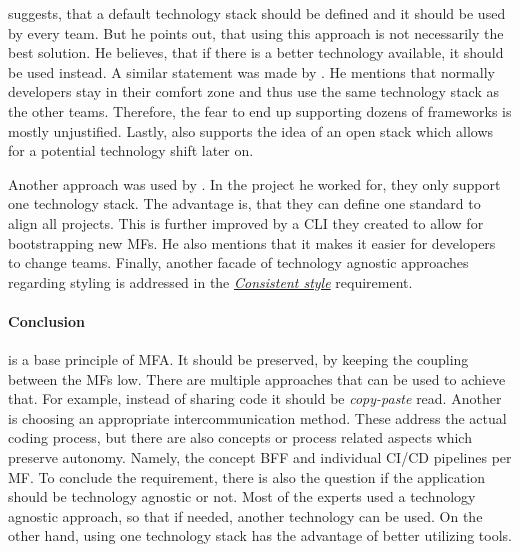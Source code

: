\textciteJovanovic{} suggests, that a default technology stack should be defined and it should be used by every team.
But he points out, that using this approach is not necessarily the best solution.
He believes, that if there is a better technology available, it should be used instead.
A similar statement was made by \textcite{Laug.2018b}.
He mentions that normally developers stay in their comfort zone and thus use the same technology stack as the other teams.
Therefore, the fear to end up supporting dozens of frameworks is mostly unjustified.
Lastly, \textciteHuber{} also supports the idea of an open stack which allows for a potential technology shift later on.

Another approach was used by \textcite{Grijzen.2019}.
In the project he worked for, they only support one technology stack.
The advantage is, that they can define one standard to align all projects.
This is further improved by a \ac{CLI} they created to allow for bootstrapping new \acp{MF}.
He also mentions that it makes it easier for developers to change teams.
Finally, another facade of technology agnostic approaches regarding styling is addressed  in the \textit{\hyperref[cha:requirement_detail_style]{Consistent style}} requirement.



\paragraph{Conclusion}

\textit{} is a base principle of \ac{MFA}.
It should be preserved, by keeping the coupling between the \acp{MF} low.
There are multiple approaches that can be used to achieve that.
For example, instead of sharing code it should be \textit{copy-paste} read.
Another is choosing an appropriate intercommunication method.
These address the actual coding process, but there are also concepts or process related aspects which preserve autonomy.
Namely, the concept \ac{BFF} and individual \ac{CI/CD} pipelines per \ac{MF}.
To conclude the \textit{} requirement, there is also the question if the application should be technology agnostic or not.
Most of the experts used a technology agnostic approach, so that if needed, another technology can be used.
On the other hand, using one technology stack has the advantage of better utilizing tools.





